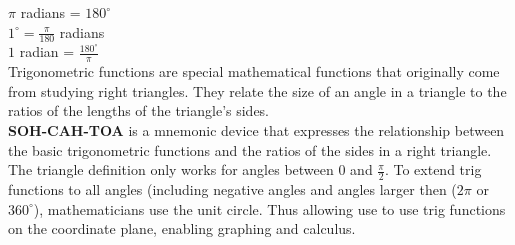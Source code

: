 \documentclass{article}
\begin{document}
$\pi$ radians = $180^{\circ}$\\
$1^\circ = \frac{\pi}{180}$ radians\\
$1$ radian = $\frac{180^\circ}{\pi}$\\

Trigonometric functions are special mathematical functions that originally come from studying right triangles. They relate the size of an angle in a triangle to the ratios of the lengths of the triangle's sides.\\

\textbf{SOH-CAH-TOA} is a mnemonic device that expresses the relationship between the basic trigonometric functions and the ratios of the sides in a right triangle.\\

The triangle definition only works for angles between 0 and $\frac{\pi}{2}$. To extend trig functions to all angles (including negative angles and angles larger then ($2\pi$ or $360^{\circ}$), mathematicians use the unit circle. Thus allowing use to use trig functions on the coordinate plane, enabling graphing and calculus.\\
\end{document}
